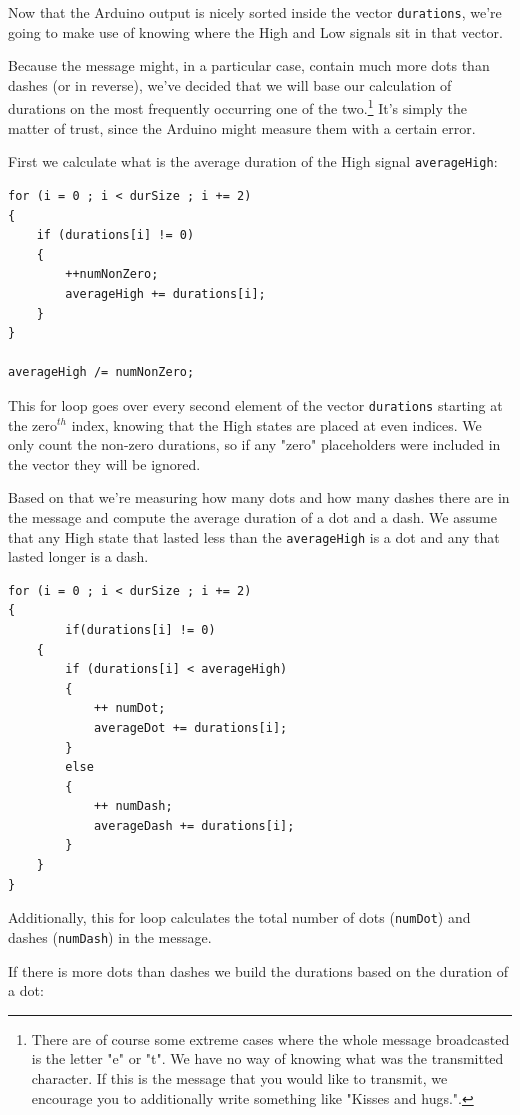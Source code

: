 \documentclass[12pt]{report}
\begin{document}
Now that the Arduino output is nicely sorted inside the vector \texttt{durations}, we're going to make use of knowing where the High and Low signals sit in that vector.  

Because the message might, in a particular case, contain much more dots than dashes (or in reverse), we've decided that we will base our calculation of durations on the most frequently occurring one of the two.\footnote{There are of course some extreme cases where the whole message broadcasted is the letter "e" or "t". We have no way of knowing what was the transmitted character. If this is the message that you would like to transmit, we encourage you to additionally write something like "Kisses and hugs.".} It's simply the matter of trust, since the Arduino might measure them with a certain error.

First we calculate what is the average duration of the High signal \texttt{averageHigh}:

\begin{lstlisting}
for (i = 0 ; i < durSize ; i += 2)
{
	if (durations[i] != 0)
	{
		++numNonZero;
		averageHigh += durations[i];
	}
}

averageHigh /= numNonZero;
\end{lstlisting}

This for loop goes over every second element of the vector \texttt{durations} starting at the zero$^{th}$ index, knowing that the High states are placed at even indices. We only count the non-zero durations, so if any "zero" placeholders were included in the vector they will be ignored.

Based on that we're measuring how many dots and how many dashes there are in the message and compute the average duration of a dot and a dash. We assume that any High state that lasted less than the \texttt{averageHigh} is a dot and any that lasted longer is a dash.

\begin{lstlisting}
for (i = 0 ; i < durSize ; i += 2)
{
     	if(durations[i] != 0)
	{
		if (durations[i] < averageHigh)
		{
			++ numDot;
			averageDot += durations[i];
		}
		else
		{
			++ numDash;
			averageDash += durations[i];
		}
	}
}
\end{lstlisting}

Additionally, this for loop calculates the total number of dots (\texttt{numDot}) and dashes (\texttt{numDash}) in the message.

If there is more dots than dashes we build the durations based on the duration of a dot:
\end{document}
